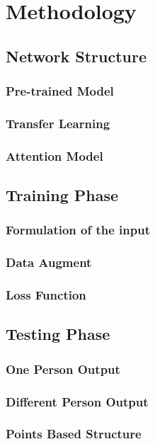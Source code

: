 \documentclass[senior]{IPSstyle}
\begin{document}
\chapter{Methodology} \label{methodology}
\section{Network Structure} \label{network structure}
\subsection{Pre-trained Model}
\subsection{Transfer Learning}
\subsection{Attention Model}

\section{Training Phase} \label{training phase}
\subsection{Formulation of the input}
\subsection{Data Augment}
\subsection{Loss Function}


\section{Testing Phase} \label{testing phase}
\subsection{One Person Output}
\subsection{Different Person Output}
\subsection{Points Based Structure}
\end{document}
